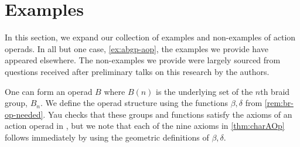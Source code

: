 \section{Examples}\label{sec:aop-examples}

In this section, we expand our collection of examples  and non-examples of action operads. 
In all but one case, \cref{ex:abgp-aop}, the examples we provide have appeared elsewhere.
The non-examples we provide were largely sourced from questions received after preliminary talks on this research by the authors. 

\begin{example}\label{example:aop-braid}
One can form an operad $B$ where $B(n)$ is the underlying set of the $n$th braid group, $B_{n}$.
We define the operad structure using the functions $\beta, \delta$ from \cref{rem:br-op-needed}.
Yau checks that these groups and functions satisfy the axioms of an action operad in \cite[Prop 5.2.5]{yau_infinity_2021}, but we note that each of the nine axioms in \cref{thm:charAOp} follows immediately by using the geometric definitions of $\beta, \delta$.
\end{example}


